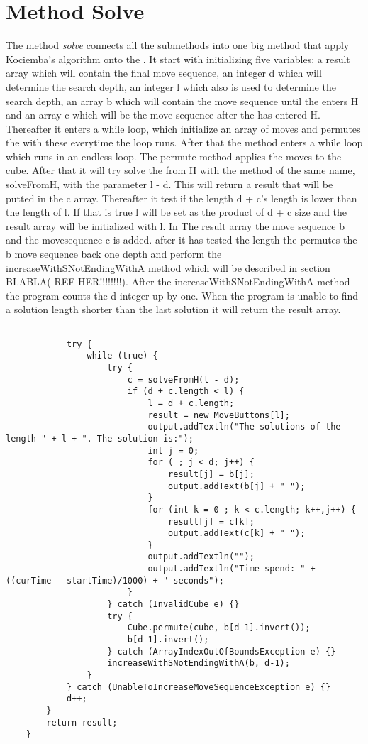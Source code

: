 \section{Method Solve}

The method \textit{solve} connects all the submethods into one big method that apply Kociemba's algorithm onto the \rubik{}. It start with initializing five variables; a result array which will contain the final move sequence, an integer d which will determine the search depth, an integer l which also is used to determine the search depth, an array b which will contain the move sequence until the \rubik{} enters H and an array c which will be the move sequence after the \rubik{} has entered H. Thereafter it enters a while loop, which initialize an array of moves and permutes the \rubik{} with these everytime the loop runs. After that the method enters a while loop which runs in an endless loop. The permute method applies the moves to the cube. After that it will try solve the \rubik{} from H with the method of the same name, solveFromH, with the parameter l - d.  This will return a result that will be putted in the c array. Thereafter it test if the length d + c's length is lower than the length of l. If that is true  l will be set as the product of d + c size and the result array will be initialized with l. In The result array the move sequence b and the movesequence c is added. after it has tested the length the \rubik{}  permutes the b move sequence back one depth and perform the increaseWithSNotEndingWithA method which will be described in section BLABLA( REF HER!!!!!!!!). After the increaseWithSNotEndingWithA method the program counts the d integer up by one. When the program is unable to find a solution length shorter than the last solution it will return the result array.


\begin{verbatim}
			
			try {
				while (true) {
					try {
						c = solveFromH(l - d);
						if (d + c.length < l) {
							l = d + c.length;
							result = new MoveButtons[l];
							output.addTextln("The solutions of the length " + l + ". The solution is:");
							int j = 0;
							for ( ; j < d; j++) {
								result[j] = b[j];
								output.addText(b[j] + " ");
							}
							for (int k = 0 ; k < c.length; k++,j++) {
								result[j] = c[k];
								output.addText(c[k] + " ");
							}
							output.addTextln("");
							output.addTextln("Time spend: " + ((curTime - startTime)/1000) + " seconds");
						}
					} catch (InvalidCube e) {}
					try {
						Cube.permute(cube, b[d-1].invert());
						b[d-1].invert();
					} catch (ArrayIndexOutOfBoundsException e) {}
					increaseWithSNotEndingWithA(b, d-1);
				}
			} catch (UnableToIncreaseMoveSequenceException e) {}
			d++;
		}
		return result;
	}
\end{verbatim}